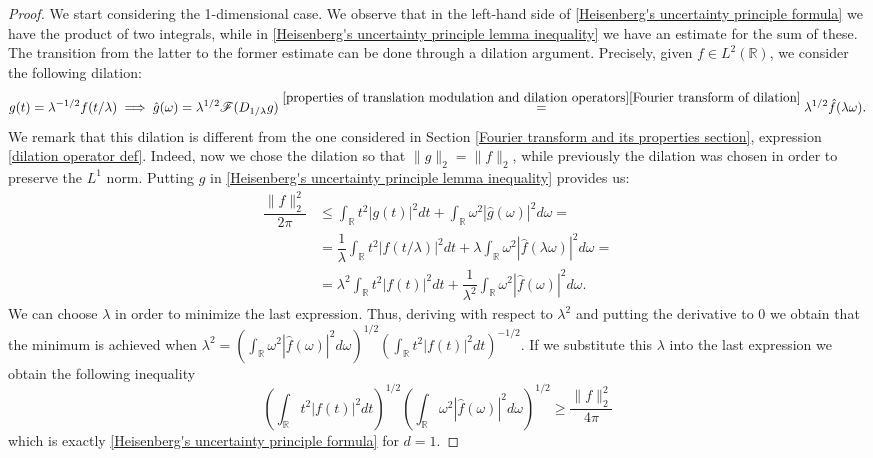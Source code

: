 \documentclass[corpo=11pt, stile=classica, tipotesi=custom,
greek, evenboxes, english]{toptesi}
\numberwithin{equation}{chapter}
\theoremstyle{remark}
\newcommand{\R}{\mathbb{R}} %
\newcommand{\F}{\mathscr{F}} %
\begin{document}
\begin{proof}
	We start considering the 1-dimensional case. We observe that in the left-hand side of \eqref{Heisenberg's uncertainty principle formula} we have the product of two integrals, while in \eqref{Heisenberg's uncertainty principle lemma inequality} we have an estimate for the sum of these. The transition from the latter to the former estimate can be done through a dilation argument. Precisely, given $f \in L^2(\R)$, we consider the following dilation:
	\begin{equation*}
		g(t) = \lambda^{-1/2}f(t/\lambda) \implies \hat{g}(\omega) = \lambda^{1/2} \F(D_{1/\lambda}g) \overset{\ref{properties of translation modulation and dilation operators}\ref{Fourier transform of dilation}}{=} \lambda^{1/2} \hat{f}(\lambda \omega).
	\end{equation*}
	We remark that this dilation is different from the one considered in Section \ref{Fourier transform and its properties section}, expression \eqref{dilation operator def}. Indeed, now we chose the dilation so that $\|g\|_2 = \|f\|_2$, while previously the dilation was chosen in order to preserve the $L^1$ norm. Putting $g$ in \eqref{Heisenberg's uncertainty principle lemma inequality} provides us:
	\begin{align*}
		\dfrac{\|f\|_2^2}{2\pi} &\leq \int_{\R} t^2 |g(t)|^2dt + \int_{\R} \omega^2 |\hat{g}(\omega)|^2d\omega =\\
								&= \dfrac{1}{\lambda} \int_{\R} t^2 |f(t/\lambda)|^2dt  + \lambda \int_{\R} \omega^2 |\hat{f}(\lambda \omega)|^2d\omega = \\
								&= \lambda^2 \int_{\R} t^2 |f(t)|^2dt + \dfrac{1}{\lambda^2} \int_{\R} \omega^2 |\hat{f}(\omega)|^2d\omega.
	\end{align*}
	We can choose $\lambda$ in order to minimize the last expression. Thus, deriving with respect to $\lambda^2$ and putting the derivative to 0 we obtain that the minimum is achieved when $\lambda^2 = (\int_{\R} \omega^2 |\hat{f}(\omega)|^2d\omega)^{1/2} (\int_{\R} t^2 |f(t)|^2dt)^{-1/2}.$ If we substitute this $\lambda$ into the last expression we obtain the following inequality
	\begin{equation}\label{Heisenberg's uncertainty principle inequality 2}
		\left( \int_{\R} t^2 |f(t)|^2dt \right)^{1/2} \left(\int_{\R} \omega^2 |\hat{f}(\omega)|^2d\omega \right)^{1/2} \geq \dfrac{\|f\|_2^2}{4\pi}
	\end{equation}
	which is exactly \eqref{Heisenberg's uncertainty principle formula} for $d=1$.
\end{proof}
\end{document}
